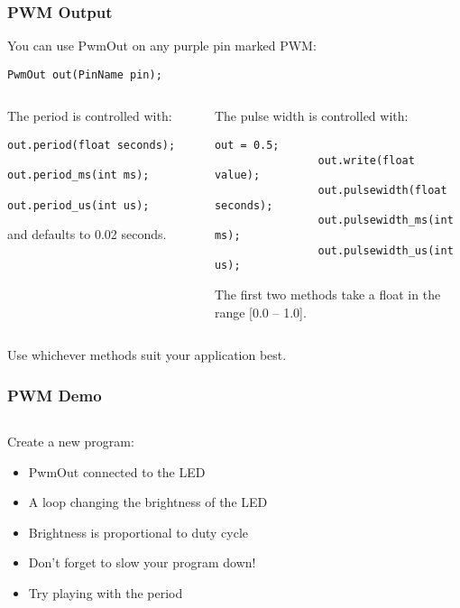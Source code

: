 \begin{frame}[fragile]
	\frametitle{PWM Output}
	You can use PwmOut on any purple pin marked PWM:
	\begin{lstlisting}[numbers=none]
		PwmOut out(PinName pin);
	\end{lstlisting}
	\vfill
	\begin{columns}[T]
		\begin{column}{0.5\textwidth}
			The period is controlled with:
			\begin{lstlisting}[numbers=none]
				out.period(float seconds);
				out.period_ms(int ms);
				out.period_us(int us);
			\end{lstlisting}
			and defaults to 0.02 seconds.
		\end{column}
		\begin{column}{0.5\textwidth}
			The pulse width is controlled with:
			\begin{lstlisting}[numbers=none]
				out = 0.5;
				out.write(float value);
				out.pulsewidth(float seconds);
				out.pulsewidth_ms(int ms);
				out.pulsewidth_us(int us);
			\end{lstlisting}
			The first two methods take a float in the range [0.0 -- 1.0].
		\end{column}
	\end{columns}
	\vfill
	Use whichever methods suit your application best.
\end{frame}

\begin{frame}[fragile]
	\frametitle{PWM Demo}
	\begin{columns}[T]
		\begin{column}{0.5\textwidth}
			Create a new program:
			\begin{itemize}
				\item PwmOut connected to the LED
				\item A loop changing the brightness of the LED
				\pause
				\item Brightness is proportional to duty cycle
				\item Don't forget to slow your program down!
				\pause
				\item Try playing with the period
			\end{itemize}
		\end{column}
		\begin{column}{0.5\textwidth}
			
		\end{column}
	\end{columns}
\end{frame}

